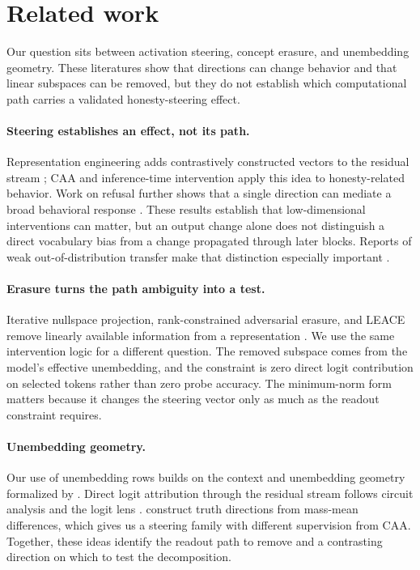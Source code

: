 \section{Related work}\label{sec:related}

Our question sits between activation steering, concept erasure, and unembedding geometry. These literatures show that directions can change behavior and that linear subspaces can be removed, but they do not establish which computational path carries a validated honesty-steering effect.

\paragraph{Steering establishes an effect, not its path.}
Representation engineering adds contrastively constructed vectors to the residual stream \citep{zou2023repe}; CAA \citep{rimsky2024caa} and inference-time intervention \citep{li2023iti} apply this idea to honesty-related behavior. Work on refusal further shows that a single direction can mediate a broad behavioral response \citep{arditi2024refusal}. These results establish that low-dimensional interventions can matter, but an output change alone does not distinguish a direct vocabulary bias from a change propagated through later blocks. Reports of weak out-of-distribution transfer make that distinction especially important \citep{tan2024analysing}.

\paragraph{Erasure turns the path ambiguity into a test.}
Iterative nullspace projection, rank-constrained adversarial erasure, and LEACE remove linearly available information from a representation \citep{ravfogel2020inlp,ravfogel2022rlace,belrose2023leace}. We use the same intervention logic for a different question. The removed subspace comes from the model's effective unembedding, and the constraint is zero direct logit contribution on selected tokens rather than zero probe accuracy. The minimum-norm form matters because it changes the steering vector only as much as the readout constraint requires.

\paragraph{Unembedding geometry.}
Our use of unembedding rows builds on the context and unembedding geometry formalized by \citet{park2024linear}. Direct logit attribution through the residual stream follows circuit analysis and the logit lens \citep{elhage2021mathematical,nostalgebraist2020logitlens}. \citet{marks2024geometry} construct truth directions from mass-mean differences, which gives us a steering family with different supervision from CAA. Together, these ideas identify the readout path to remove and a contrasting direction on which to test the decomposition.

